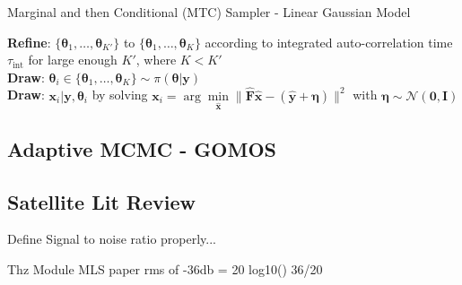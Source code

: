 \begin{algorithm}[!thb]
    \caption{Marginal and then Conditional (MTC) Sampler - Linear Gaussian Model}
    \label{alg:MTC}
    \SetAlgoLined
    \textbf{Refine}: $\{ \bm{\theta}_{1}, \dots ,\bm{\theta}_{K'}\}$ to $\{ \bm{\theta}_{1}, \dots ,\bm{\theta}_{K}\}$  according to integrated auto-correlation time $\tau_{\text{int}}$ for large enough $K'$, where $K< K'$\\
    \textbf{Draw}: $\bm{\theta}_{i} \in \{ \bm{\theta}_{1}, \dots ,\bm{\theta}_{K}\} \sim \pi(\bm{\theta}| \bm{y})$ \\
    \textbf{Draw}: $\bm{x}_i | \bm{y}, \bm{\theta}_{i}$ by solving $  \bm{x}_i = \arg \underset{\hat{\bm{x}}}{\min} \lVert \hat{\bm{F}} \hat{\bm{x}} - ( \hat{\bm{y}} + \bm{\eta} ) \rVert^2$ with $\bm{\eta} \sim \mathcal{N}(\bm{0}, \mathbf{I})$
\end{algorithm}



\subsection{Adaptive MCMC - GOMOS}
\label{subsec:GOMOS}


\subsection{Satellite Lit Review}

Define Signal to noise ratio properly...


Thz Module MLS paper
rms of -36db = 20 log10()
36/20



